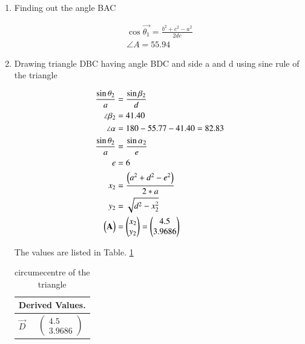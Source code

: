 \begin{enumerate}[label=\thesection.\arabic*.,ref=\thesection.\theenumi]
\item Finding out the angle BAC

\begin{align}
\cos{\vec{\theta_1}} = \frac{b^2 + c^2 -a^2}{2dc}
\\
\angle{A} = 55.94
\end{align}

\item Drawing triangle DBC having angle BDC and side a and d using sine rule of the triangle 

\begin{align}
\frac{\sin{\theta_2}}{a} &= \frac{\sin{\beta_2}}{d}
\\
\angle{\beta_2} &= 41.40
\\
\angle{\alpha} &= 180 - 55.77-41.40 = 82.83
\\
\frac{\sin{\theta_2}}{a} &= \frac{\sin{\alpha_2}}{e}
\\
e &= 6
\\
x_2 &= \frac{\left(a^2 + d^2 - e^2\right)}{2*a}
\\
y_2 &= \sqrt{d^2 - x_2^2}
\\
\begin{pmatrix}\mathbf{A}\end{pmatrix} &= \begin{pmatrix}x_2 \\ y_2\end{pmatrix} = \begin{pmatrix}4.5\\ 3.9686\end{pmatrix}
\end{align}


The values are listed in 
Table. \ref{table:table2} 
\begin{table}[ht!]
\centering
\begin{tabular}{ |p{3cm}|p{3cm}|  }
\hline
 \multicolumn{2}{|c|}{Derived Values.} \\
\hline
$\vec{D}$ & $$\begin{pmatrix}4.5\\3.9686\end{pmatrix}$$\\						
\hline
\end{tabular}
\caption{circumecentre of the triangle}
\label{table:table2}
\end{table}



\end{enumerate}
